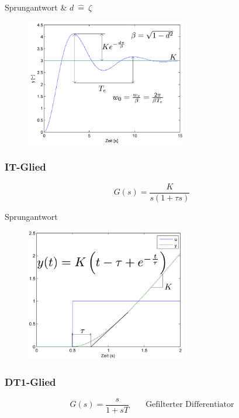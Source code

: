 \documentclass[
  10pt,
  a4paper,
  twocolumn]{article}
\numberwithin{equation}{section}
\begin{document}
Sprungantwort \& \(d\ \hat{=}\ \zeta\)

\begin{figure}[H]

{\centering \includegraphics[width=7cm,height=\textheight]{images/paste-19.png}

}

\end{figure}

\hypertarget{it-glied}{%
\subsubsection{IT-Glied}\label{it-glied}}

\[
G(s)=\frac{K}{s(1+\tau s)}
\]

Sprungantwort

\begin{figure}[H]

{\centering \includegraphics[width=7cm,height=\textheight]{images/paste-21.png}

}

\end{figure}

\hypertarget{dt1-glied}{%
\subsubsection{DT1-Glied}\label{dt1-glied}}

\[
G(s)=\frac{s}{1+sT} \qquad \text{Gefilterter Differentiator}
\]
\end{document}
